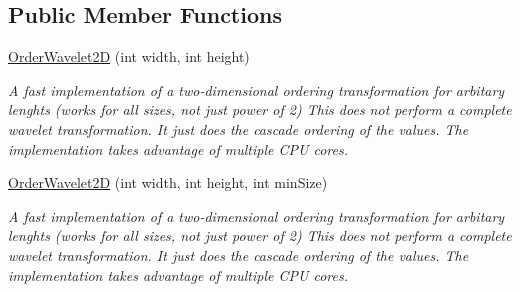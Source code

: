 \subsection*{\-Public \-Member \-Functions}
\begin{DoxyCompactItemize}
\item 
\hyperlink{class_turbo_wavelets_1_1_order_wavelet2_d_aed357d3d66affbf094ee6e104ac75f1f}{\-Order\-Wavelet2\-D} (int width, int height)
\begin{DoxyCompactList}\small\item\em \-A fast implementation of a two-\/dimensional ordering transformation for arbitary lenghts (works for all sizes, not just power of 2) \-This does not perform a complete wavelet transformation. \-It just does the cascade ordering of the values. \-The implementation takes advantage of multiple \-C\-P\-U cores. \end{DoxyCompactList}\item 
\hyperlink{class_turbo_wavelets_1_1_order_wavelet2_d_a22aec9d1c8fd7f56ac480a305ce4e9cd}{\-Order\-Wavelet2\-D} (int width, int height, int min\-Size)
\begin{DoxyCompactList}\small\item\em \-A fast implementation of a two-\/dimensional ordering transformation for arbitary lenghts (works for all sizes, not just power of 2) \-This does not perform a complete wavelet transformation. \-It just does the cascade ordering of the values. \-The implementation takes advantage of multiple \-C\-P\-U cores. \end{DoxyCompactList}\end{DoxyCompactItemize}
